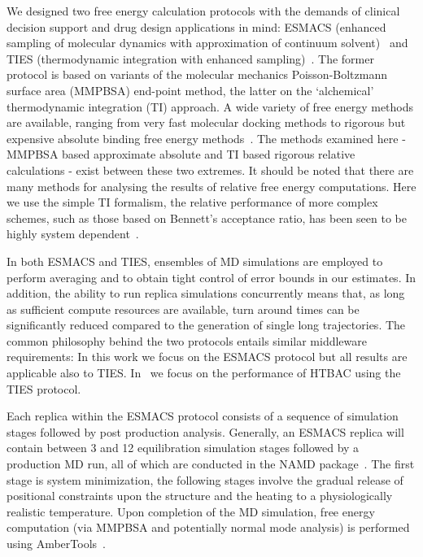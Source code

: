 \documentclass{bmcart}
\begin{document}
We designed two free energy calculation protocols with the demands of clinical
decision support and drug design applications in mind: ESMACS (enhanced
sampling of molecular dynamics with approximation of continuum
solvent)~\cite{Wan2017brd4} and TIES (thermodynamic integration with enhanced
sampling)~\cite{Bhati2017}. The former protocol is based on variants of the
molecular mechanics Poisson-Boltzmann surface area (MMPBSA) end-point method,
the latter on the `alchemical' thermodynamic integration (TI) approach. 
 A wide variety of free energy methods are available, ranging from very fast molecular docking 
 methods to rigorous but expensive absolute binding free energy methods~\cite{Mobley2009}. The methods examined here 
 - MMPBSA based approximate absolute and TI based rigorous relative calculations - 
 exist between these two extremes.  It should be noted that there are many methods for analysing 
 the results of relative free energy  computations. 
 Here we use the simple TI formalism, the relative performance of more complex schemes, such as those based 
 on Bennett's acceptance ratio, has been seen to be highly system dependent~\cite{Ruiter2013, Christ2014, Bhati2018}.

In
both ESMACS and TIES, ensembles of MD simulations are employed to perform averaging and
to obtain tight control of error bounds in our estimates. In addition, the
ability to run replica simulations concurrently means that, as long as
sufficient compute resources are available, turn around times can be
significantly reduced compared to the generation of single long trajectories.
The common philosophy behind the two protocols entails similar middleware
requirements: In this work we focus on the ESMACS protocol but all results are
applicable also to TIES. In~\cite{dakka} we focus on the performance of HTBAC using the 
TIES protocol. 

Each replica within the ESMACS protocol consists of a sequence of simulation
stages followed by post production analysis. Generally, an ESMACS replica will
contain between 3 and 12 equilibration simulation stages followed by a
production MD run, all of which are conducted in the NAMD
package~\cite{Phillips2005}. The first stage is system minimization, the
following stages involve the gradual release of positional constraints upon
the structure and the heating to a physiologically realistic temperature.
Upon completion of the MD simulation, free energy computation (via MMPBSA and
potentially normal mode analysis) is performed using
AmberTools~\cite{Case2005, MillerIII2012}.
\end{document}

